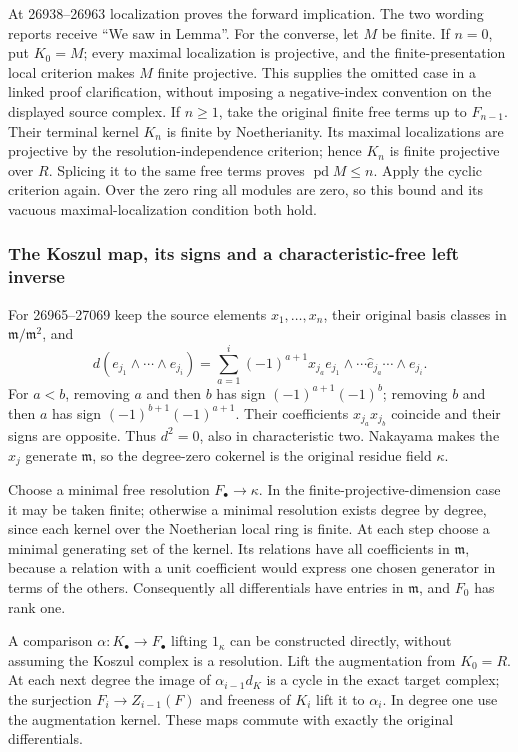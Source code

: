 At 26938--26963 localization proves the forward implication. The two wording reports receive ``We saw in Lemma''. For the converse, let \(M\) be finite. If \(n=0\), put \(K_0=M\); every maximal localization is projective, and the finite-presentation local criterion makes \(M\) finite projective. This supplies the omitted case in a linked proof clarification, without imposing a negative-index convention on the displayed source complex. If \(n\ge1\), take the original finite free terms up to \(F_{n-1}\). Their terminal kernel \(K_n\) is finite by Noetherianity. Its maximal localizations are projective by the resolution-independence criterion; hence \(K_n\) is finite projective over \(R\). Splicing it to the same free terms proves \(\operatorname{pd}M\le n\). Apply the cyclic criterion again. Over the zero ring all modules are zero, so this bound and its vacuous maximal-localization condition both hold.

\subsubsection{The Koszul map, its signs and a characteristic-free left inverse}\label{algebra-proof-023-the-koszul-map-its-signs-and-a-characteristic-free-left-inverse}

For 26965--27069 keep the source elements \(x_1,\ldots,x_n\), their original basis classes in \(\mathfrak m/\mathfrak m^2\), and \[
d(e_{j_1}\wedge\cdots\wedge e_{j_i})
=\sum_{a=1}^i(-1)^{a+1}x_{j_a}
 e_{j_1}\wedge\cdots\widehat e_{j_a}\cdots\wedge e_{j_i}.
\] For \(a<b\), removing \(a\) and then \(b\) has sign \((-1)^{a+1}(-1)^b\); removing \(b\) and then \(a\) has sign \((-1)^{b+1}(-1)^{a+1}\). Their coefficients \(x_{j_a}x_{j_b}\) coincide and their signs are opposite. Thus \(d^2=0\), also in characteristic two. Nakayama makes the \(x_j\) generate \(\mathfrak m\), so the degree-zero cokernel is the original residue field \(\kappa\).

Choose a minimal free resolution \(F_\bullet\to\kappa\). In the finite-projective-dimension case it may be taken finite; otherwise a minimal resolution exists degree by degree, since each kernel over the Noetherian local ring is finite. At each step choose a minimal generating set of the kernel. Its relations have all coefficients in \(\mathfrak m\), because a relation with a unit coefficient would express one chosen generator in terms of the others. Consequently all differentials have entries in \(\mathfrak m\), and \(F_0\) has rank one.

A comparison \(\alpha:K_\bullet\to F_\bullet\) lifting \(1_\kappa\) can be constructed directly, without assuming the Koszul complex is a resolution. Lift the augmentation from \(K_0=R\). At each next degree the image of \(\alpha_{i-1}d_K\) is a cycle in the exact target complex; the surjection \(F_i\to Z_{i-1}(F)\) and freeness of \(K_i\) lift it to \(\alpha_i\). In degree one use the augmentation kernel. These maps commute with exactly the original differentials.

